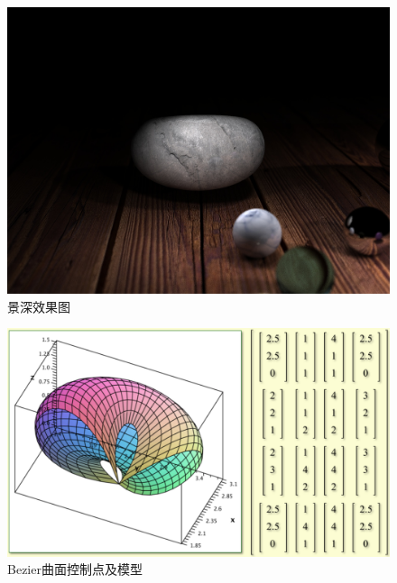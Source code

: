 \documentclass[12pt]{article}
\begin{document}
\begin{figure}[h]
\centering
\includegraphics[width=\linewidth]{js.jpg}
\caption{景深效果图}
\label{fig:2}
\end{figure}

\begin{figure}[h]
\centering
\includegraphics[width=\linewidth]{Bezier.png}
\caption{Bezier曲面控制点及模型}
\label{fig:3}
\end{figure}
\end{document}
